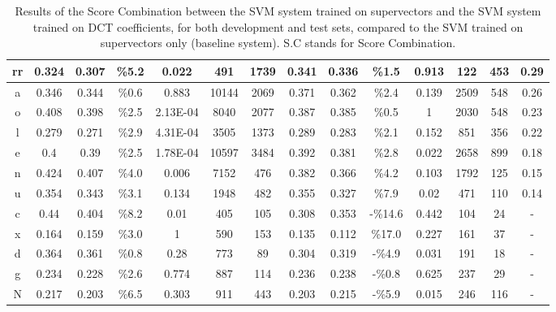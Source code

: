 \begin{table}[H]
{\begin{tabular}{|c| |c|c|c|c|c|c| |c|c|c|c|c|c| |c|}
\rowcolor{lightgray} rr & 0.324 & 0.307 & \%5.2 & 0.022 & 491 & 1739 & 0.341 & 0.336 & \%1.5 & 0.913 & 122 & 453 & 0.29 \\ \hline
a & 0.346 & 0.344 & \%0.6 & 0.883 & 10144 & 2069 & 0.371 & 0.362 & \%2.4 & 0.139 & 2509 & 548 & 0.26 \\ \hline
\rowcolor{lightgray} o & 0.408 & 0.398 & \%2.5 & 2.13E-04 & 8040 & 2077 & 0.387 & 0.385 & \%0.5 & 1 & 2030 & 548 & 0.23 \\ \hline
\rowcolor{lightgray} l & 0.279 & 0.271 & \%2.9 & 4.31E-04 & 3505 & 1373 & 0.289 & 0.283 & \%2.1 & 0.152 & 851 & 356 & 0.22 \\ \hline
\rowcolor{lightgray} e & 0.4 & 0.39 & \%2.5 & 1.78E-04 & 10597 & 3484 & 0.392 & 0.381 & \%2.8 & 0.022 & 2658 & 899 & 0.18 \\ \hline
\rowcolor{lightgray} n & 0.424 & 0.407 & \%4.0 & 0.006 & 7152 & 476 & 0.382 & 0.366 & \%4.2 & 0.103 & 1792 & 125 & 0.15 \\ \hline
u & 0.354 & 0.343 & \%3.1 & 0.134 & 1948 & 482 & 0.355 & 0.327 & \%7.9 & 0.02 & 471 & 110 & 0.14 \\ \hline
c & 0.44 & 0.404 & \%8.2 & 0.01 & 405 & 105 & 0.308 & 0.353 & -\%14.6 & 0.442 & 104 & 24 & - \\ \hline
x & 0.164 & 0.159 & \%3.0 & 1 & 590 & 153 & 0.135 & 0.112 & \%17.0 & 0.227 & 161 & 37 & - \\ \hline
d & 0.364 & 0.361 & \%0.8 & 0.28 & 773 & 89 & 0.304 & 0.319 & -\%4.9 & 0.031 & 191 & 18 & - \\ \hline
g & 0.234 & 0.228 & \%2.6 & 0.774 & 887 & 114 & 0.236 & 0.238 & -\%0.8 & 0.625 & 237 & 29 & - \\ \hline
N & 0.217 & 0.203 & \%6.5 & 0.303 & 911 & 443 & 0.203 & 0.215 & -\%5.9 & 0.015 & 246 & 116 & - \\ \hline
\end{tabular}

}
\caption{Results of the Score Combination between the SVM system trained on supervectors
and the SVM system trained on DCT coefficients, for both development and test sets,
compared to the SVM trained on supervectors only (baseline system). S.C stands for
Score Combination.}
\label{tab:scoreCombinationAppendixTable}
\end{table}

